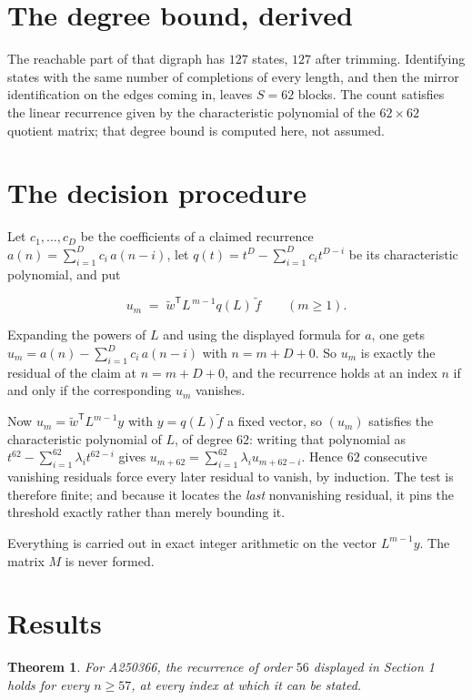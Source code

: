 \documentclass[11pt]{article}
\newtheorem{theorem}{Theorem}
\theoremstyle{definition}
\begin{document}
\section{The degree bound, derived}

The reachable part of that digraph has $127$ states, $127$ after trimming. Identifying states with the same number of completions of every length, and then the mirror identification on the edges coming in, leaves $S = 62$ blocks. The count satisfies the linear recurrence given by the characteristic polynomial of the $62\times62$ quotient matrix; that degree bound is computed here, not assumed.

\section{The decision procedure}

Let $c_1,\dots,c_D$ be the coefficients of a claimed recurrence $a(n) = \sum_{i=1}^{D} c_i\,a(n-i)$, let $q(t) = t^{D} - \sum_{i=1}^{D} c_i t^{D-i}$ be its characteristic polynomial, and put

\[u_m \;=\; \tilde w^{\mathsf T} L^{\,m-1} q(L)\,\tilde f \qquad (m \ge 1).\]

Expanding the powers of $L$ and using the displayed formula for $a$, one gets $u_m = a(n) - \sum_{i=1}^{D} c_i\,a(n-i)$ with $n = m + D + 0$. So $u_m$ is exactly the residual of the claim at $n = m + D + 0$, and the recurrence holds at an index $n$ if and only if the corresponding $u_m$ vanishes.

Now $u_m = \tilde w^{\mathsf T} L^{m-1} y$ with $y = q(L)\tilde f$ a fixed vector, so $(u_m)$ satisfies the characteristic polynomial of $L$, of degree $62$: writing that polynomial as $t^{62} - \sum_{i=1}^{62} \lambda_i t^{62-i}$ gives $u_{m+62} = \sum_{i=1}^{62} \lambda_i u_{m+62-i}$. Hence $62$ consecutive vanishing residuals force every later residual to vanish, by induction. The test is therefore finite; and because it locates the {\itshape last} nonvanishing residual, it pins the threshold exactly rather than merely bounding it.

Everything is carried out in exact integer arithmetic on the vector $L^{m-1}y$. The matrix $M$ is never formed.

\section{Results}

\begin{theorem} For A250366, the recurrence of order $56$ displayed in Section 1 holds for every $n \ge 57$, at every index at which it can be stated.\end{theorem}
\end{document}
